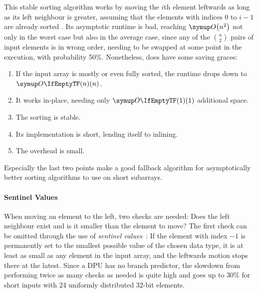 \section{\texorpdfstring{\IS{}}{InsertionSort}}
\label{sec:tasklet:insertion}

This stable sorting algorithm works by moving the \(i\)th element leftwards as long as its left neighbour is greater, assuming that the elements with indices \(0\) to \(i - 1\) are already sorted \cites[83]{maurer1974datenstrukturen}[Chapter~2.2.1]{wirth1975algorithmen}.
Its asymptotic runtime is bad, reaching \(\bigoh*{n^2}\) not only in the worst case but also in the average case, since any of the \(\binom{n}{2}\) pairs of input elements is in wrong order, needing to be swapped at some point in the execution, with probability 50\%.
Nonetheless, \IS{} does have some saving graces:
\begin{enumerate}
	\item
	If the input array is mostly or even fully sorted, the runtime drops down to \(\bigoh{n}\).

	\item
	It works in-place, needing only \(\bigoh{1}\) additional space.

	\item
	The sorting is stable.

	\item
	Its implementation is short, lending itself to inlining.

	\item
	The overhead is small.
\end{enumerate}
Especially the last two points make \IS{} a good fallback algorithm for asymptotically better sorting algorithms to use on short subarrays.


\paragraph{Sentinel Values}
When moving an element to the left, two checks are needed:
Does the left neighbour exist and is it smaller than the element to move?
The first check can be omitted through the use of \emph{sentinel values}~\cite[93]{wirth1975algorithmen}:
If the element with index \(-1\) is permanently set to the smallest possible value of the chosen data type, it is at least as small as any element in the input array, and the leftwards motion stops there at the latest.
Since a DPU has no branch predictor, the slowdown from performing twice as many checks as needed is quite high and goes up to 30\% for short inputs with 24 uniformly distributed 32-bit elements.

